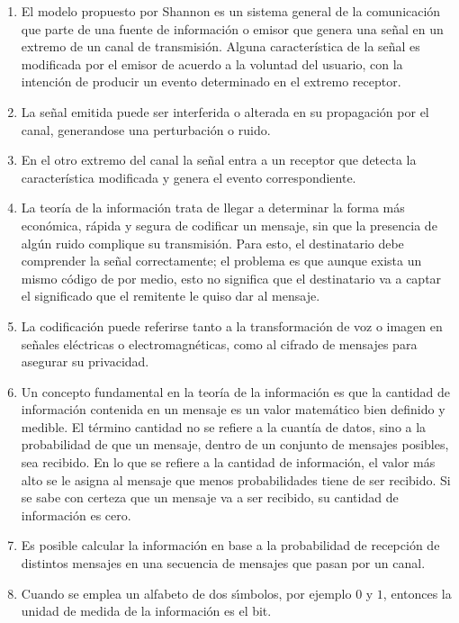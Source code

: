 \begin{enumerate}
\item El modelo propuesto por Shannon es un sistema general de la comunicación que parte de una fuente de información o emisor que genera una señal en un extremo de un canal de transmisión. Alguna característica de la señal es modificada por el emisor de acuerdo a la voluntad del usuario, con la intención de producir un evento determinado en el extremo receptor.

\item La señal emitida puede ser interferida o alterada en su propagación por el canal, generandose una perturbación o ruido.

\item En el otro extremo del canal la señal entra a un receptor que detecta la característica modificada y genera el evento correspondiente.

\item La teoría de la información trata de llegar a determinar la forma más económica, rápida y segura de codificar un mensaje, sin que la presencia de algún ruido complique su transmisión. Para esto, el destinatario debe comprender la señal correctamente; el problema es que aunque exista un mismo código de por medio, esto no significa que el destinatario va a captar el significado que el remitente le quiso dar al mensaje. 

\item La codificación puede referirse tanto a la transformación de voz o imagen en señales eléctricas o electromagnéticas, como al cifrado de mensajes para asegurar su privacidad. 

\item Un concepto fundamental en la teoría de la información es que la cantidad de información contenida en un mensaje es un valor matemático bien definido y medible. El término cantidad no se refiere a la cuantía de datos, sino a la probabilidad de que un mensaje, dentro de un conjunto de mensajes posibles, sea recibido. En lo que se refiere a la cantidad de información, el valor más alto se le asigna al mensaje que menos probabilidades tiene de ser recibido. Si se sabe con certeza que un mensaje va a ser recibido, su cantidad de información es cero.

\item Es posible calcular la informaci\'{o}n en base a la probabilidad
  de recepción de distintos mensajes en una secuencia de mensajes que
  pasan por un canal.

\item Cuando se emplea un alfabeto de dos s\'{\i}mbolos, por ejemplo
  $0$ y $1$, entonces la unidad de medida de la informaci\'{o}n es el
  bit.


\end{enumerate}
